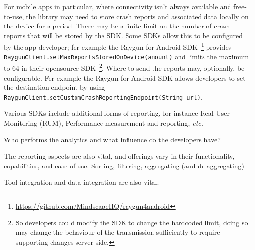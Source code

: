For mobile apps in particular, where connectivity isn't always available and free-to-use, the library may need to store crash reports and associated data locally on the device for a period. There may be a finite limit on the number of crash reports that will be stored by the SDK. Some SDKs allow this to be configured by the app developer; for example the Raygun for Android SDK~\footnote{\url{https://github.com/MindscapeHQ/raygun4android}} provides \texttt{RaygunClient.setMaxReportsStoredOnDevice(amount)} and limits the maximum to 64 in their opensource SDK~\footnote{So developers could modify the SDK to change the hardcoded limit, doing so may change the behaviour of the transmission sufficiently to require supporting changes server-side.}. Where to send the reports may, optionally, be configurable. For example the Raygun for Android SDK allows developers to set the destination endpoint by using \texttt{RaygunClient.setCustomCrashReportingEndpoint(String url)}.

Various SDKs include additional forms of reporting, for instance Real User Monitoring (RUM), Performance measurement and reporting, \emph{etc.} %

Who performs the analytics and what influence do the developers have?

The reporting aspects are also vital, and offerings vary in their functionality, capabilities, and ease of use. Sorting, filtering, aggregating (and de-aggregating) 

Tool integration and data integration are also vital.


